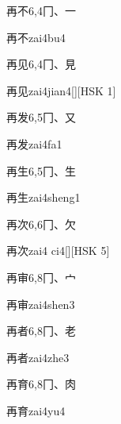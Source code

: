 \begin{entry}{再不}{6,4}{⼌、⼀}
  \begin{phonetics}{再不}{zai4bu4}
  \end{phonetics}
\end{entry}

\begin{entry}{再见}{6,4}{⼌、⾒}
  \begin{phonetics}{再见}{zai4jian4}[][HSK 1]
  \end{phonetics}
\end{entry}

\begin{entry}{再发}{6,5}{⼌、⼜}
  \begin{phonetics}{再发}{zai4fa1}
  \end{phonetics}
\end{entry}

\begin{entry}{再生}{6,5}{⼌、⽣}
  \begin{phonetics}{再生}{zai4sheng1}
  \end{phonetics}
\end{entry}

\begin{entry}{再次}{6,6}{⼌、⽋}
  \begin{phonetics}{再次}{zai4 ci4}[][HSK 5]
  \end{phonetics}
\end{entry}

\begin{entry}{再审}{6,8}{⼌、⼧}
  \begin{phonetics}{再审}{zai4shen3}
  \end{phonetics}
\end{entry}

\begin{entry}{再者}{6,8}{⼌、⽼}
  \begin{phonetics}{再者}{zai4zhe3}
  \end{phonetics}
\end{entry}

\begin{entry}{再育}{6,8}{⼌、⾁}
  \begin{phonetics}{再育}{zai4yu4}
  \end{phonetics}
\end{entry}

